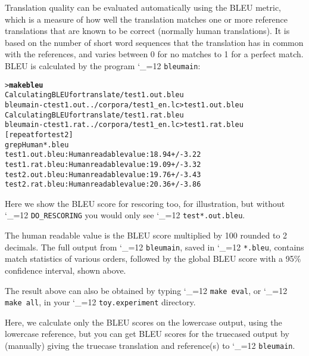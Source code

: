 \documentclass[11pt,letterpaper]{article}
\def\code{\begingroup\catcode`\_=12 \codex}
\newcommand{\codex}[1]{\texttt{#1}\endgroup}
\begin{document}
Translation quality can be evaluated automatically using the BLEU metric, which
is a measure of how well the translation matches one or more reference
translations that are known to be correct (normally human translations). It is
based on the number of short word sequences that the translation has in common
with the references, and varies between 0 for no matches to 1 for a perfect
match. BLEU is calculated by the program \code{bleumain}:
\begin{small}
\begin{alltt}
   > \textbf{make bleu}
   Calculating BLEU for translate/test1.out.bleu
   bleumain -c test1.out ../corpora/test1_en.lc > test1.out.bleu
   Calculating BLEU for translate/test1.rat.bleu
   bleumain -c test1.rat ../corpora/test1_en.lc > test1.rat.bleu
   [repeat for test2]
   grep Human *.bleu
   test1.out.bleu:Human readable value: 18.94 +/- 3.22
   test1.rat.bleu:Human readable value: 19.09 +/- 3.32
   test2.out.bleu:Human readable value: 19.76 +/- 3.43
   test2.rat.bleu:Human readable value: 20.36 +/- 3.86
\end{alltt}
\end{small}
Here we show the BLEU score for rescoring too, for illustration, but without
\code{DO_RESCORING} you would only see \code{test*.out.bleu}.

The human readable value is the BLEU score multiplied by 100 rounded to 2
decimals. The full output from \code{bleumain}, saved in \code{*.bleu},
contains match statistics of various orders, followed by the global BLEU score
with a 95\% confidence interval, shown above.

The result above can also be obtained by typing \code{make eval}, or
\code{make all}, in your \code{toy.experiment} directory.

Here, we calculate only the BLEU scores on the lowercase output, using the
lowercase reference, but you can get BLEU scores for the truecased output by
(manually) giving the truecase translation and reference(s) to \code{bleumain}.
\end{document}
